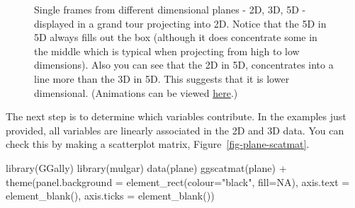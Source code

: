 \documentclass[
  letterpaper,
]{krantz}
\newenvironment{Shaded}{\begin{snugshade}}{\end{snugshade}}
\newcommand{\AttributeTok}[1]{\textcolor[rgb]{0.40,0.45,0.13}{#1}}
\newcommand{\ConstantTok}[1]{\textcolor[rgb]{0.56,0.35,0.01}{#1}}
\newcommand{\FunctionTok}[1]{\textcolor[rgb]{0.28,0.35,0.67}{#1}}
\newcommand{\NormalTok}[1]{\textcolor[rgb]{0.00,0.23,0.31}{#1}}
\newcommand{\SpecialCharTok}[1]{\textcolor[rgb]{0.37,0.37,0.37}{#1}}
\newcommand{\StringTok}[1]{\textcolor[rgb]{0.13,0.47,0.30}{#1}}
\begin{document}
\begin{figure}
\begin{minipage}{0.33\linewidth}
{}


\end{minipage}%

\caption{\label{fig-dimension-pdf}Single frames from different
dimensional planes - 2D, 3D, 5D - displayed in a grand tour projecting
into 2D. Notice that the 5D in 5D always fills out the box (although it
does concentrate some in the middle which is typical when projecting
from high to low dimensions). Also you can see that the 2D in 5D,
concentrates into a line more than the 3D in 5D. This suggests that it
is lower dimensional. (Animations can be viewed
\href{https://dicook.github.io/mulgar_book/3-intro-dimred.html}{here}.)}

\end{figure}%

The next step is to determine which variables contribute. In the
examples just provided, all variables are linearly associated in the 2D
and 3D data. You can check this by making a scatterplot matrix,
Figure~\ref{fig-plane-scatmat}.

\begin{Shaded}
\begin{Highlighting}[]
\FunctionTok{library}\NormalTok{(GGally)}
\FunctionTok{library}\NormalTok{(mulgar)}
\FunctionTok{data}\NormalTok{(plane)}
\FunctionTok{ggscatmat}\NormalTok{(plane) }\SpecialCharTok{+}
  \FunctionTok{theme}\NormalTok{(}\AttributeTok{panel.background =} 
          \FunctionTok{element\_rect}\NormalTok{(}\AttributeTok{colour=}\StringTok{"black"}\NormalTok{, }\AttributeTok{fill=}\ConstantTok{NA}\NormalTok{),}
    \AttributeTok{axis.text =} \FunctionTok{element\_blank}\NormalTok{(),}
    \AttributeTok{axis.ticks =} \FunctionTok{element\_blank}\NormalTok{())}
\end{Highlighting}
\end{Shaded}
\end{document}
